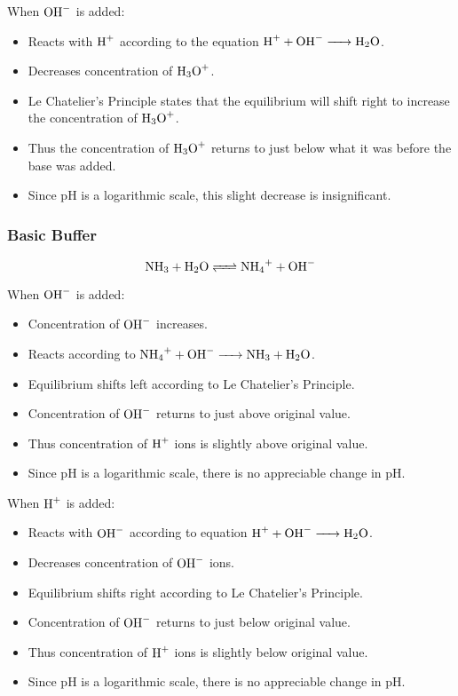 \documentclass[a4paper,11pt]{article}
\begin{document}
When $\ce{OH-}$ is added:

\begin{itemize}
\item Reacts with $\ce{H+}$ according to the equation $\ce{H+ + OH- -> H2O}$.
\item Decreases concentration of $\ce{H3O+}$.
\item Le Chatelier's Principle states that the equilibrium will shift right to
	increase the concentration of $\ce{H3O+}$.
\item Thus the concentration of $\ce{H3O+}$ returns to just below what it was
	before the base was added.
\item Since pH is a logarithmic scale, this slight decrease is insignificant.
\end{itemize}


\subsubsection{Basic Buffer}

$$
\ce{NH3 + H2O <=> NH4+ + OH-}
$$

When $\ce{OH-}$ is added:

\begin{itemize}
\item Concentration of $\ce{OH-}$ increases.
\item Reacts according to $\ce{NH4+ + OH- -> NH3 + H2O}$.
\item Equilibrium shifts left according to Le Chatelier's Principle.
\item Concentration of $\ce{OH-}$ returns to just above original value.
\item Thus concentration of $\ce{H+}$ ions is slightly above original value.
\item Since pH is a logarithmic scale, there is no appreciable change in pH.
\end{itemize}

When $\ce{H+}$ is added:

\begin{itemize}
\item Reacts with $\ce{OH-}$ according to equation $\ce{H+ + OH- -> H2O}$.
\item Decreases concentration of $\ce{OH-}$ ions.
\item Equilibrium shifts right according to Le Chatelier's Principle.
\item Concentration of $\ce{OH-}$ returns to just below original value.
\item Thus concentration of $\ce{H+}$ ions is slightly below original value.
\item Since pH is a logarithmic scale, there is no appreciable change in pH.
\end{itemize}
\end{document}
